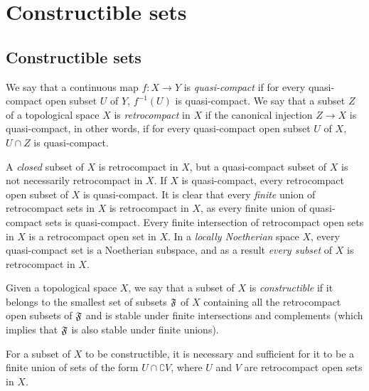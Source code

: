 \section{Constructible sets}
\label{section:constructible sets}

\subsection{Constructible sets}
\label{subsection:constructible sets}

\begin{defn}[9.1.1]
\label{0.9.1.1}
We say that a continuous map $f:X\to Y$ is \emph{quasi-compact} if for every quasi-compact open subset $U$ of $Y$, $f^{-1}(U)$ is quasi-compact.
We say that a subset $Z$ of a topological space $X$ is \emph{retrocompact} in $X$ if the canonical injection $Z\to X$ is quasi-compact, in other words, if for every quasi-compact open subset $U$ of $X$, $U\cap Z$ is quasi-compact.
\end{defn}

A \emph{closed} subset of $X$ is retrocompact in $X$, but a quasi-compact subset of $X$ is not necessarily retrocompact in $X$.
If $X$ is quasi-compact, every retrocompact open subset of $X$ is quasi-compact.
It is clear that every \emph{finite} union of retrocompact sets in $X$ is retrocompact in $X$, as every finite union of quasi-compact sets is quasi-compact.
Every finite intersection of retrocompact open sets in $X$ is a retrocompact open set in $X$.
In a \emph{locally Noetherian} space $X$, every quasi-compact set is a Noetherian subspace, and as a result \emph{every subset} of $X$ is retrocompact in $X$.

\begin{defn}[9.1.2]
\label{0.9.1.2}
Given a topological space $X$, we say that a subset of $X$ is \emph{constructible} if it belongs to the smallest set of subsets $\mathfrak{F}$ of $X$ containing all the retrocompact open subsets of $\mathfrak{F}$ and is stable under finite intersections and complements (which implies that $\mathfrak{F}$ is also stable under finite unions).
\end{defn}

\begin{prop}[9.1.3]
\label{0.9.1.3}
For a subset of $X$ to be constructible, it is necessary and sufficient for it to be a finite union of sets of the form $U\cap\complement{V}$, where $U$ and $V$ are retrocompact open sets in $X$.
\end{prop}

